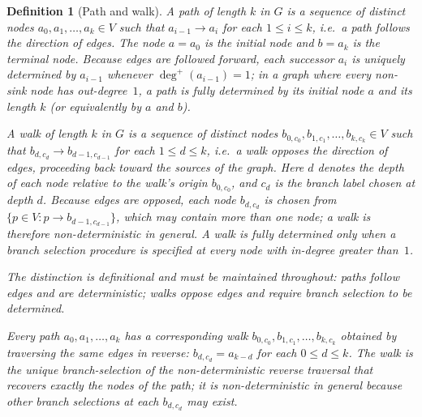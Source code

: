 \documentclass[11pt,a4paper]{article}
\newtheorem{definition}[theorem]{Definition}
\theoremstyle{remark}
\theoremstyle{plain}
\begin{document}
\begin{definition}[Path and walk]\label{def:pathwalk}
A \emph{path} of length $k$ in $G$ is a sequence of distinct nodes
$a_0, a_1, \ldots, a_k \in V$ such that $a_{i-1} \to a_i$ for each $1 \le i \le k$,
i.e.\ a path \emph{follows} the direction of edges.
The node $a = a_0$ is the \emph{initial node} and $b = a_k$ is the \emph{terminal node}.
Because edges are followed forward, each successor $a_i$ is uniquely determined by
$a_{i-1}$ whenever $\deg^+(a_{i-1}) = 1$; in a graph where every non-sink node has
out-degree~$1$, a path is \emph{fully determined} by its initial node $a$ and its
length $k$ (or equivalently by $a$ and $b$).

A \emph{walk} of length $k$ in $G$ is a sequence of distinct nodes
$b_{0,c_0}, b_{1,c_1}, \ldots, b_{k,c_k} \in V$ such that
$b_{d,c_d} \to b_{d-1,c_{d-1}}$ for each $1 \le d \le k$,
i.e.\ a walk \emph{opposes} the direction of edges, proceeding back toward the
sources of the graph.
Here $d$ denotes the depth of each node relative to the walk's origin $b_{0,c_0}$,
and $c_d$ is the branch label chosen at depth $d$.
Because edges are opposed, each node $b_{d,c_d}$ is chosen from
$\{p \in V : p \to b_{d-1,c_{d-1}}\}$, which may contain more than one node; a walk is
therefore \emph{non-deterministic} in general.
A walk is fully determined only when a \emph{branch selection procedure} is specified
at every node with in-degree greater than~$1$.

The distinction is definitional and must be maintained throughout: \emph{paths follow
edges and are deterministic; walks oppose edges and require branch selection to be
determined.}

Every path $a_0, a_1, \ldots, a_k$ has a \emph{corresponding walk}
$b_{0,c_0}, b_{1,c_1}, \ldots, b_{k,c_k}$ obtained by traversing the same edges in
reverse: $b_{d,c_d} = a_{k-d}$ for each $0 \le d \le k$.
The walk is the unique branch-selection of the non-deterministic reverse traversal
that recovers exactly the nodes of the path; it is non-deterministic in general
because other branch selections at each $b_{d,c_d}$ may exist.
\end{definition}
\end{document}
